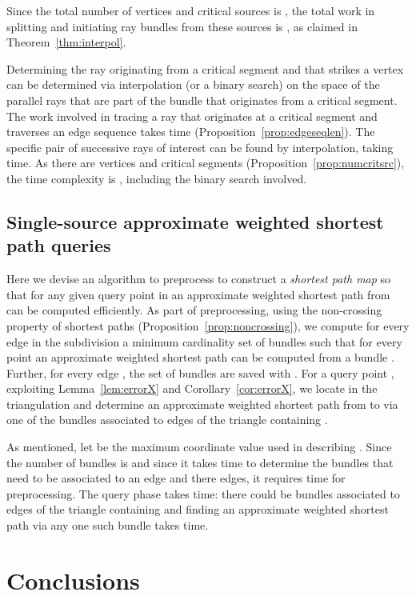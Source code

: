 \documentclass[11pt]{article}
\newenvironment{proof}{\par\noindent{\bf Proof:}}{\mbox{}\hfill\\}
\begin{document}
\begin{proof}
Since the total number of vertices and critical sources is , the total work in splitting and initiating ray bundles from these sources is , as claimed in Theorem~\ref{thm:interpol}.

Determining the ray originating from a critical segment and that strikes  a vertex can be determined via interpolation (or a binary search) on the space of the parallel rays that are part of the bundle that originates from a  critical segment.
The work involved in tracing a ray that originates at a critical segment and traverses an edge sequence takes  time (Proposition~\ref{prop:edgeseqlen}).
The specific pair of successive rays of interest can be found by interpolation, taking  time.
As there are  vertices and  critical segments (Proposition~\ref{prop:numcritsrc}), the time complexity is , including the binary search involved.
\end{proof}

\subsection*{Single-source approximate weighted shortest path queries}
\label{subsect:sssp}

Here we devise an algorithm to preprocess  to construct a {\it shortest path map} so that for any given query point  in  an approximate weighted shortest path from  can be computed efficiently.
As part of preprocessing, using the non-crossing property of shortest paths (Proposition~\ref{prop:noncrossing}), we compute for every edge  in the subdivision a minimum cardinality set  of bundles such that for every point  an approximate weighted shortest path can be computed from a bundle .
Further, for every edge , the set  of bundles are saved with .
For a query point , exploiting Lemma~\ref{lem:errorX} and Corollary~\ref{cor:errorX}, we locate  in the triangulation and determine an approximate weighted shortest path from  to  via one of the bundles associated to edges of the triangle containing .

As mentioned, let  be the maximum coordinate value used in describing .
Since the number of bundles is  and since it takes  time to determine the bundles that need to be associated to an edge and there  edges, it requires  time for preprocessing.
The query phase takes  time: there could be  bundles associated to edges of the triangle containing  and finding an approximate weighted shortest path via any one such bundle takes  time.

\section{Conclusions}
\label{sect:conclu}
\end{document}

